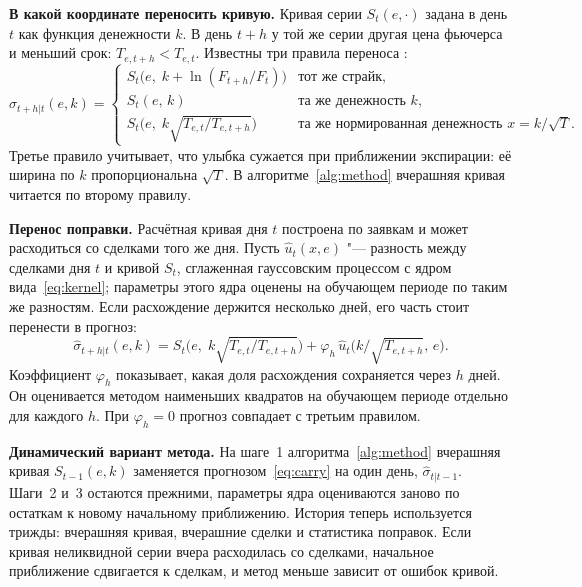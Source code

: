 \documentclass{article}
\begin{document}
\textbf{В какой координате переносить кривую.} Кривая серии $S_t(e,\cdot)$ задана в день $t$ как функция денежности $k$. В день $t+h$ у той же серии другая цена фьючерса и меньший срок: $T_{e,t+h}<T_{e,t}$. Известны три правила переноса \citep{derman1999regimes,daglish2007volatility}:
\begin{equation}\label{eq:rules}
\hat\sigma_{t+h|t}(e,k)=
\begin{cases}
S_t\bigl(e,\;k+\ln(F_{t+h}/F_t)\bigr) & \text{тот же страйк},\\[2pt]
S_t(e,\,k) & \text{та же денежность }k,\\[2pt]
S_t\bigl(e,\;k\sqrt{T_{e,t}/T_{e,t+h}}\bigr) & \text{та же нормированная денежность }x=k/\sqrt{T}.
\end{cases}
\end{equation}
Третье правило учитывает, что улыбка сужается при приближении экспирации: её ширина по $k$ пропорциональна $\sqrt{T}$. В алгоритме~\ref{alg:method} вчерашняя кривая читается по второму правилу.

\textbf{Перенос поправки.} Расчётная кривая дня $t$ построена по заявкам и может расходиться со сделками того же дня. Пусть $\hat u_t(x,e)$ "--- разность между сделками дня $t$ и кривой $S_t$, сглаженная гауссовским процессом с ядром вида~\eqref{eq:kernel}; параметры этого ядра оценены на обучающем периоде по таким же разностям. Если расхождение держится несколько дней, его часть стоит перенести в прогноз:
\begin{equation}\label{eq:carry}
\hat\sigma_{t+h|t}(e,k)=S_t\bigl(e,\;k\sqrt{T_{e,t}/T_{e,t+h}}\bigr)+\varphi_h\,\hat u_t\bigl(k/\sqrt{T_{e,t+h}},\,e\bigr).
\end{equation}
Коэффициент $\varphi_h$ показывает, какая доля расхождения сохраняется через $h$ дней. Он оценивается методом наименьших квадратов на обучающем периоде отдельно для каждого $h$. При $\varphi_h=0$ прогноз совпадает с третьим правилом.

\textbf{Динамический вариант метода.} На шаге~1 алгоритма~\ref{alg:method} вчерашняя кривая $S_{t-1}(e,k)$ заменяется прогнозом~\eqref{eq:carry} на один день, $\hat\sigma_{t|t-1}$. Шаги~2 и~3 остаются прежними, параметры ядра оцениваются заново по остаткам к новому начальному приближению. История теперь используется трижды: вчерашняя кривая, вчерашние сделки и статистика поправок. Если кривая неликвидной серии вчера расходилась со сделками, начальное приближение сдвигается к сделкам, и метод меньше зависит от ошибок кривой.
\end{document}
